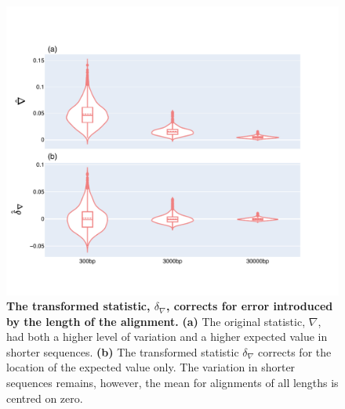\begin{figure}[!ht]
\centering
\includegraphics[width=\textwidth]{figures/plots/synthetic/d-conv-vs-conv/High JSD, High Entropy.pdf}
\caption{\textbf{The transformed statistic, $\delta_\nabla$, corrects for error introduced by the length of the alignment.} \textbf{(a)} The original statistic, $\nabla$, had both a higher level of variation and a higher expected value in shorter sequences. \textbf{(b)} The transformed statistic $\delta_\nabla$ corrects for the location of the expected value only. The variation in shorter sequences remains, however, the mean for alignments of all lengths is centred on zero.}
\label{fig:synthetic/d-conv-vs-conv/HighJSDHighEntropy}
\end{figure}